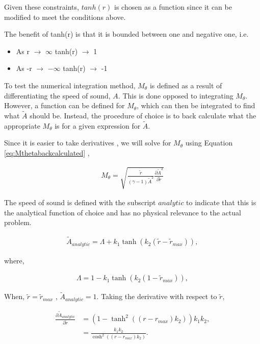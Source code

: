 \documentclass[12pt]{article}
\begin{document}
Given these constraints, $tanh(r)$ is chosen as a function since it can be
modified to meet the conditions above.

The benefit of tanh(r) is that it is bounded between one and negative one, i.e.

\begin{itemize}
    \item As r $\rightarrow$ $\infty$ tanh(r) $\rightarrow$ 1
    \item As -r $\rightarrow$ $-\infty$ tanh(r) $\rightarrow$ -1
\end{itemize}

To test the numerical integration method,  $M_{\theta}$ is defined as a result 
of differentiating the speed of sound, $A$. This is done opposed to integrating
$M_{\theta}$. However, a function can be defined for $M_{\theta}$, which can 
then be integrated to find what $\widetilde{A}$ should be. 
Instead, the procedure of choice is to back calculate what the appropriate 
$M_{\theta}$ is for a given expression for $\widetilde{A}$.

Since it is easier to take derivatives , we will solve for $M_{\theta}$ using 
Equation \ref{eq:Mthetabackcalculated} ,

\begin{align*}
    M_{\theta} = \sqrt{ \frac{\widetilde{r}}{(\gamma -1) \widetilde{A}^2} 
    \frac{\partial \widetilde{A}^2}{\partial \widetilde{r}}}
\end{align*}

The speed of sound is defined with the subscript $analytic$ to indicate 
that this is the analytical function of choice and has no physical relevance 
to the actual problem.

\begin{align*}
\widetilde{A}_{analytic} = \Lambda + k_1 \tanh \left( k_2 \left( \widetilde{r} - \widetilde{r}_{max} \right) \right),
\end{align*}

where, 

\begin{align*}
    \Lambda = 1 - k_1 \tanh(k_2 (1 - \widetilde{r}_{max})),
\end{align*}

When, $\widetilde{r}=\widetilde{r}_{max}$ , $\widetilde{A}_{analytic} = 1$.  
Taking the derivative with respect to $\widetilde{r}$,

\begin{align*}
    \frac{\partial \widetilde{A}_{analytic} }{\partial \widetilde{r}} &=
    \left(1 - \tanh^{2}{\left(\left(r - r_{max}\right) {k}_{2} \right)}\right) {k}_{1} {k}_{2}, \\ 
    &= \frac{ k_{1} k_{2}}{\cosh^{2}{\left(\left(r - r_{max}\right) {k}_{2} \right)}}.
\end{align*}
\end{document}
